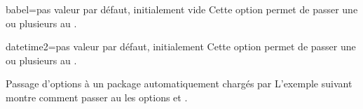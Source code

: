 \begin{docKey}{babel}{=}{pas valeur par défaut,
    initialement vide}
  Cette option permet de passer une ou plusieurs  au
  .
\end{docKey}
\begin{docKey}{datetime2}{=}{pas valeur par défaut,
    initialement }
  Cette option permet de passer une ou plusieurs  au
  .
\end{docKey}
%
%

\begin{dbexample}{Passage d'options à un package  automatiquement chargés par \yat}{}
  L'exemple suivant montre comment passer au  les options
   et .
\end{dbexample}

